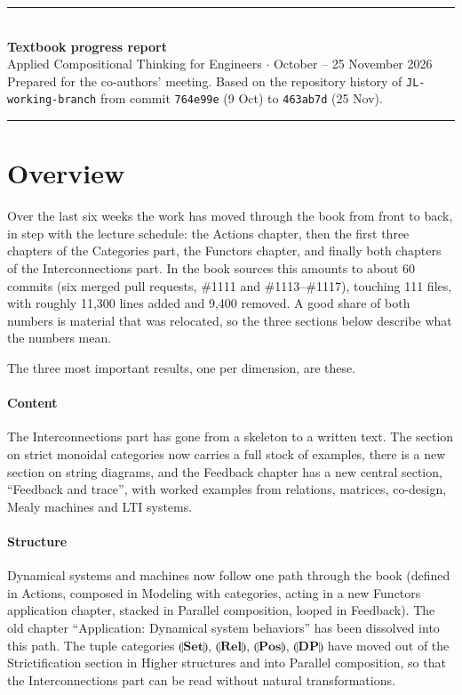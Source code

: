 \documentclass[11pt,a4paper]{article}
\newcommand{\tL}[1]{\llparenthesis\mathbf{#1}\rrparenthesis}   %
\begin{document}
{\sffamily
{\color{accent}\rule{\textwidth}{1.2pt}}\\[0.9em]
{\LARGE\bfseries Textbook progress report}\\[0.35em]
{\large Applied Compositional Thinking for Engineers \quad$\cdot$ October -- 25 November 2026}\\[0.5em]
{\small\color{rulegray} Prepared for the co-authors' meeting. Based on the repository history of
\texttt{JL-working-branch} from commit \texttt{764e99e} (9 Oct) to \texttt{463ab7d} (25 Nov).}\\[0.3em]
{\color{accent}\rule{\textwidth}{0.4pt}}
}

\section{Overview}

Over the last six weeks the work has moved through the book from front to back, in step with the
lecture schedule: the Actions chapter, then the first three chapters of the Categories part, the
Functors chapter, and finally both chapters of the Interconnections part. In the book sources
this amounts to about 60 commits (six merged pull requests, \#1111 and \#1113--\#1117), touching
111 files, with roughly 11{,}300 lines added and 9{,}400 removed. A good share of both numbers is
material that was relocated, so the three sections below describe what the numbers mean.

The three most important results, one per dimension, are these.

\paragraph{Content} The Interconnections part has gone from a skeleton to a written text. The
section on strict monoidal categories now carries a full stock of examples, there is a new section
on string diagrams, and the Feedback chapter has a new central section, ``Feedback and trace'',
with worked examples from relations, matrices, co-design, Mealy machines and LTI systems.

\paragraph{Structure} Dynamical systems and machines now follow one path through the book
(defined in Actions, composed in Modeling with categories, acting in a new Functors application
chapter, stacked in Parallel composition, looped in Feedback). The old chapter ``Application:
Dynamical system behaviors'' has been dissolved into this path. The tuple categories
$\tL{Set}$, $\tL{Rel}$, $\tL{Pos}$, $\tL{DP}$ have moved out of the Strictification section in
Higher structures and into Parallel composition, so that the Interconnections part can be read
without natural transformations.
\end{document}
